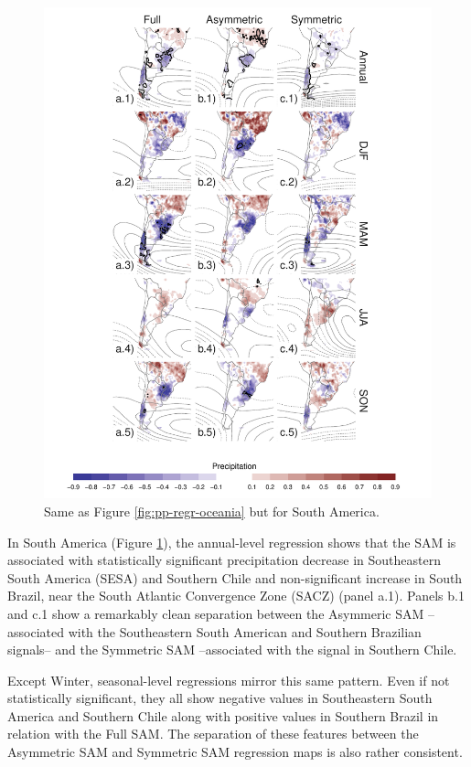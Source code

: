 \documentclass[]{ametsocV5}
\begin{document}
\begin{figure}
\includegraphics{pp-regr-america-1} \caption{Same as Figure \ref{fig:pp-regr-oceania} but for South America.}\label{fig:pp-regr-america}
\end{figure}

In South America (Figure \ref{fig:pp-regr-america}), the annual-level
regression shows that the SAM is associated with statistically
significant precipitation decrease in Southeastern South America (SESA)
and Southern Chile and non-significant increase in South Brazil, near
the South Atlantic Convergence Zone (SACZ) (panel a.1). Panels b.1 and
c.1 show a remarkably clean separation between the Asymmeric SAM
--associated with the Southeastern South American and Southern Brazilian
signals-- and the Symmetric SAM --associated with the signal in Southern
Chile.

Except Winter, seasonal-level regressions mirror this same pattern. Even
if not statistically significant, they all show negative values in
Southeastern South America and Southern Chile along with positive values
in Southern Brazil in relation with the Full SAM. The separation of
these features between the Asymmetric SAM and Symmetric SAM regression
maps is also rather consistent.
\end{document}

